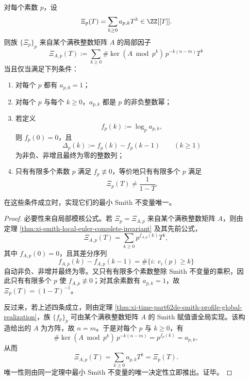 \begin{corollary}\label{cor:xi-time-part62de-local-euler-factor-realization-criterion}
对每个素数 \(p\)，设
\[
\Xi_p(T)=\sum_{k\ge 0}a_{p,k}T^k
\in \ZZ[[T]].
\]
则族 \(\{\Xi_p\}_p\) 来自某个满秩整数矩阵 \(A\) 的局部因子
\[
\Xi_{A,p}(T):=\sum_{k\ge 0}\#\ker(A\bmod p^k)\,p^{-k(n-m)}T^k
\]
当且仅当满足下列条件：
\begin{enumerate}
  \item 对每个 \(p\) 都有 \(a_{p,0}=1\)；
  \item 对每个 \(p\) 与每个 \(k\ge 0\)，\(a_{p,k}\) 都是 \(p\) 的非负整数幂；
  \item 若定义
  \[
  f_p(k):=\log_p a_{p,k},
  \]
  则 \(f_p(0)=0\)，且
  \[
  \Delta_p(k):=f_p(k)-f_p(k-1)\qquad (k\ge 1)
  \]
  为非负、非增且最终为零的整数列；
  \item 只有有限多个素数 \(p\) 满足 \(f_p\not\equiv 0\)，等价地只有有限多个 \(p\) 满足
  \[
  \Xi_p(T)\neq \frac{1}{1-T}.
  \]
\end{enumerate}
在这些条件成立时，实现它们的最小 Smith 不变量唯一。
\end{corollary}
\begin{proof}
必要性来自局部模核公式。若 \(\Xi_p=\Xi_{A,p}\) 来自某个满秩整数矩阵 \(A\)，则由定理 \ref{thm:xi-smith-local-euler-complete-invariant} 及其先前公式，
\[
\Xi_{A,p}(T)=\sum_{k\ge 0}p^{f_{A,p}(k)}T^k,
\]
其中 \(f_{A,p}(0)=0\)，且其差分序列
\[
f_{A,p}(k)-f_{A,p}(k-1)=\#\{i:\ e_i(p)\ge k\}
\]
自动非负、非增并最终为零。又只有有限多个素数整除 Smith 不变量的乘积，因此只有有限多个 \(p\) 使 \(f_{A,p}\not\equiv 0\)；对其余素数有 \(a_{p,k}=1\)，故 \(\Xi_p(T)=(1-T)^{-1}\)。

反过来，若上述四条成立，则由定理 \ref{thm:xi-time-part62de-smith-profile-global-realization}，族 \(\{f_p\}_p\) 可由某个满秩整数矩阵 \(A\) 的 Smith 赋值谱全局实现。该构造给出的 \(A\) 为方阵，故 \(n=m\)。于是对每个 \(p\) 与 \(k\ge 0\)，有
\[
\#\ker(A\bmod p^k)\,p^{-k(n-m)}=p^{f_p(k)}=a_{p,k},
\]
从而
\[
\Xi_{A,p}(T)=\sum_{k\ge 0}a_{p,k}T^k=\Xi_p(T).
\]
唯一性则由同一定理中最小 Smith 不变量的唯一决定性立即推出。证毕。
\end{proof}

